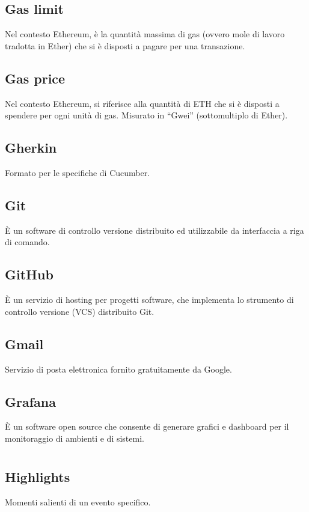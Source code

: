 	\subsection*{Gas limit}
	Nel contesto Ethereum, è la quantità massima di gas (ovvero mole di lavoro tradotta in Ether) che si è disposti a pagare per una transazione.
	\subsection*{Gas price}
	Nel contesto Ethereum, si riferisce alla quantità di ETH che si è disposti a spendere per ogni unità di gas. Misurato in “Gwei” (sottomultiplo di Ether).
	\subsection*{Gherkin}
	Formato per le specifiche di Cucumber.
	\subsection*{Git}
	È un software di controllo versione distribuito ed utilizzabile da interfaccia a riga di comando.
	\subsection*{GitHub}
	È un servizio di hosting per progetti software, che implementa lo strumento di controllo versione (VCS) distribuito Git.
	\subsection*{Gmail}
	Servizio di posta elettronica fornito gratuitamente da Google.
	\subsection*{Grafana}
	È un software open source che consente di generare grafici e dashboard per il monitoraggio di ambienti e di sistemi.
\pagebreak
\section[H]{}
	\subsection*{Highlights}
	Momenti salienti di un evento specifico. 
\pagebreak
